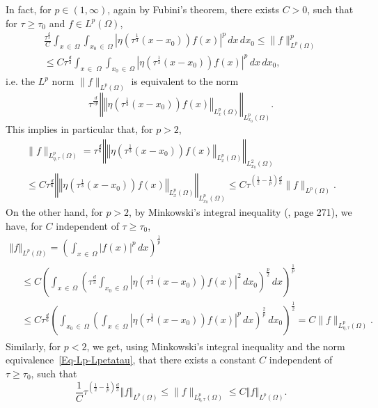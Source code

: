 \documentclass[10pt]{amsart}
\theoremstyle{definition}\newtheorem{defi}[theo]{Definition}\newtheorem{rema}[theo]{Remark}\newtheorem{exam}[theo]{Example}\newtheorem{exem}[theo]{Example}\newtheorem{nota}[theo]{Notation}
\newcommand{\norm}[1]{\left\Vert#1\right\Vert}
\renewcommand{\leq}{\leqslant}
\renewcommand{\geq}{\geqslant}
\begin{document}
In fact, for $p \in (1, \infty) $, again by Fubini's theorem, there exists $C>0$, such that for $\tau\geq \tau_0$ and $f \in L^p(\Omega)$,
\begin{multline}
\frac{\tau^{\frac{d}{3}}}{C} \int_{x\,\in\,\Omega} \int_{x_0\,\in\,\Omega} \left|\eta\left(\tau^{\frac{1}{3}}(x-x_0)\right) f(x)\right|^p \, dx \, dx_0
\leq\|f \|_{L^p(\Omega)}^p \\ \leq C \tau^{\frac{d}{3}} \int_{x\,\in\,\,\Omega} \int_{x_0\,\in\,\Omega} \left|\eta\left(\tau^{\frac{1}{3}}(x-x_0)\right) f(x)\right|^p \, dx \, dx_0,\label{Eq-Lp-Lpetatau}
\end{multline}
i.e. the $L^p$ norm $\| f \|_{L^p(\Omega)}$ is equivalent to the norm
\[
\tau^{\frac{d}{3p}} \norm{\norm{ \eta\left(\tau^{\frac{1}{3}} (x-x_0)\right) f(x) }_{L^p_x(\Omega)}}_{L^p_{x_0} (\Omega)}.
\]
This implies in particular that, for $p>2$,
\begin{multline}\label{Lp-larger-Lpetatau}
\| f \| _{L^{p}_{\eta, \tau}(\Omega)} = \tau^{\frac{d}{6}} \norm{\norm{ \eta\left(\tau^{\frac{1}{3}} (x-x_0)\right) f(x) }_{L^p_x(\Omega)}}_{L^2_{x_0} (\Omega)}
\\
\leq C \tau^{\frac{d}{6}} \norm{\norm{ \eta\left(\tau^{\frac{1}{3}} (x-x_0)\right) f(x) }_{L^p_x(\Omega)}}_{L^p_{x_0} (\Omega)}
\leq C \tau^{\left(\frac{1}{2} - \frac{1}{p}\right) \frac{d}{3}} \| f\|_{L^p(\Omega)}.
\end{multline}
On the other hand, for $p>2$, by Minkowski’s integral inequality (\cite{stein2016singular}, page 271), we have, for $C$ independent of $\tau \geq \tau_0$,
\begin{multline}\label{Lp-smaller-Lpetatau}
\norm{f}_{L^{p} (\Omega) } = \left(\int_{x\,\in \,\Omega} |f(x)|^p \, dx\right)^{\frac{1}{p}}
\\
\begin{aligned}
&\leq C \left(\int_{x\,\in\,\Omega} \left(\tau^{\frac{d}{3}} \int_{x_0\,\in\,\Omega}  \left|\eta\left(\tau^{\frac{1}{3}} (x-x_0)\right) f(x) \right|^{2} \, dx_0 \right)^{\frac{p}{2}} \, dx \right)^{\frac{1}{p}}
\\
&\leq C
\tau^{\frac{d}{6}} \left(\int_{x_0 \,\in\, \Omega} \left(\int_{x\,\in\,\Omega} \left| \eta\left(\tau^{\frac{1}{3}} (x-x_0)\right) f(x) \right|^{p} \, dx \right)^{\frac{2}{p}} \, dx_0 \right)^{\frac{1}{2}} = C \| f \| _{L^{p}_{\eta, \tau}(\Omega)}.
\end{aligned}
\end{multline}
Similarly, for $p<2$, we get, using Minkowski's integral inequality and the norm equivalence~\eqref{Eq-Lp-Lpetatau}, that there exists a constant $C$ independent of $\tau \geq \tau_0$, such that
\begin{equation}\label{Lp-eq-Lpetatau}
\frac{1}{C} \tau^{\left(\frac{1}{2} - \frac{1}{p}\right)\frac{d}{3}} \norm{ f }_{L^{p}(\Omega)}\leq \| f \| _{L^{p}_{\eta, \tau}(\Omega)} \leq C \norm{ f }_{L^{p}(\Omega)}.
\end{equation}
\end{document}
